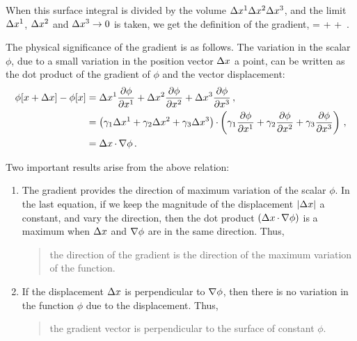 When this surface integral is divided by the volume $\Delta{x}^{1}\Delta{x}^{2}\Delta{x}^{3}$, and the limit $\Delta{x}^{1}$, $\Delta{x}^{2}$ and $\Delta{x}^{3}\to 0$ is taken, we get the definition of the gradient,
\beq
\grad\phi =  
            + 
            + \,.
\eeq

The physical significance of the gradient is as follows. The variation in the scalar $\phi$, due to a small variation in the position vector $\Delta x$ a point, can be written as the dot product of the gradient of $\phi$ and the vector displacement:
\begin{align*}
\phi\vat{\pvec + \diff\pvec} - \phi\vat\pvec 
    &= \diff\cntens\pvec 1\xpd{\phi}{\cntens\pvec 1}
        + \diff\cntens\pvec 2\xpd{\phi}{\cntens\pvec 2}
        + \diff\cntens\pvec 3\xpd{\phi}{\cntens\pvec 3}\,,\\
%    
    &= \left(\nbvec 1\diff\cntens\pvec 1 + \nbvec 2\diff\cntens\pvec 2 + \nbvec 3\diff\cntens\pvec 3\right)
        \iprod
        \left(\nbvec 1\xpd{\phi}{\cntens\pvec 1} 
            + \nbvec 2\xpd{\phi}{\cntens\pvec 2}
            + \nbvec 3\xpd{\phi}{\cntens\pvec 3}\right)\,,\\
%
    &= \diff\pvec\iprod\gder\phi\,.
\end{align*}

Two important results arise from the above relation:
\begin{enumerate}
\item The gradient provides the direction of maximum variation of the scalar $\phi$. In the last equation, if we keep the magnitude of the displacement $\lvert{\Delta x}\rvert$ a constant, and vary the direction, then the dot product $(\Delta x\operatorname{\cdot}\nabla\phi)$ is a maximum when $\Delta x$ and $\nabla\phi$ are in the same direction. Thus, 
\begin{quote}
the direction of the gradient is the direction of the maximum variation of the function.
\end{quote}
%
\item If the displacement $\Delta x$ is perpendicular to $\nabla\phi$, then there is no variation in the function $\phi$ due to the displacement. Thus, 
\begin{quote}
the gradient vector is perpendicular to the surface of constant $\phi$.
\end{quote}
\end{enumerate}

